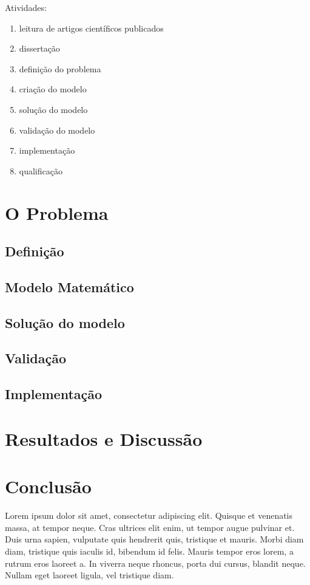 \documentclass[
	12pt,				%
	openright,			%
	oneside,			%
	a4paper,			%
	english,			%
	french,				%
	spanish,			%
	brazil				%
	]{unimontes-ppgmsc-abntex2}
\begin{document}
Atividades:
\begin{enumerate}
\item leitura de artigos científicos publicados
\item dissertação
\item definição do problema
\item criação do modelo
\item solução do modelo
\item validação do modelo
\item implementação
\item qualificação
\end{enumerate}

\chapter{O Problema}

\section{Definição}

\section{Modelo Matemático}

\section{Solução do modelo}

\section{Validação}

\section{Implementação}


\chapter{Resultados e Discussão}


\chapter{Conclusão}  
\label{sec:conclusão}  

Lorem ipsum dolor sit amet, consectetur adipiscing elit. Quisque et venenatis massa, at tempor neque. Cras ultrices elit enim, ut tempor augue pulvinar et. Duis urna sapien, vulputate quis hendrerit quis, tristique et mauris. Morbi diam diam, tristique quis iaculis id, bibendum id felis. Mauris tempor eros lorem, a rutrum eros laoreet a. In viverra neque rhoncus, porta dui cursus, blandit neque. Nullam eget laoreet ligula, vel tristique diam.
          
\end{document}
